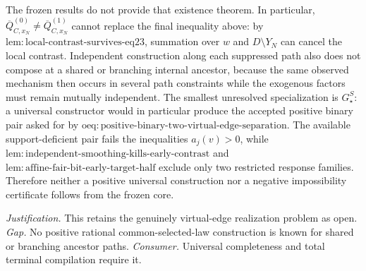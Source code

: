 \documentclass{article}
\begin{document}
The frozen results do not provide that existence theorem. In particular, \(\overline Q^{(0)}_{C,x_N}\ne\overline Q^{(1)}_{C,x_N}\) cannot replace the final inequality above: by \(\mathrm{lem:local\text{-}contrast\text{-}survives\text{-}eq23}\), summation over \(w\) and \(D\setminus Y_N\) can cancel the local contrast. Independent construction along each suppressed path also does not compose at a shared or branching internal ancestor, because the same observed mechanism then occurs in several path constraints while the exogenous factors must remain mutually independent. The smallest unresolved specialization is \(G_\star^S\): a universal constructor would in particular produce the accepted positive binary pair asked for by \(\mathrm{oeq:positive\text{-}binary\text{-}two\text{-}virtual\text{-}edge\text{-}separation}\). The available support-deficient pair fails the inequalities \(a_j(v)>0\), while \(\mathrm{lem:independent\text{-}smoothing\text{-}kills\text{-}early\text{-}contrast}\) and \(\mathrm{lem:affine\text{-}fair\text{-}bit\text{-}early\text{-}target\text{-}half}\) exclude only two restricted response families. Therefore neither a positive universal construction nor a negative impossibility certificate follows from the frozen core.
\par\smallskip\noindent \textit{Justification.} This retains the genuinely virtual-edge realization problem as open. \textit{Gap.} No positive rational common-selected-law construction is known for shared or branching ancestor paths. \textit{Consumer.} Universal completeness and total terminal compilation require it.
\end{document}
